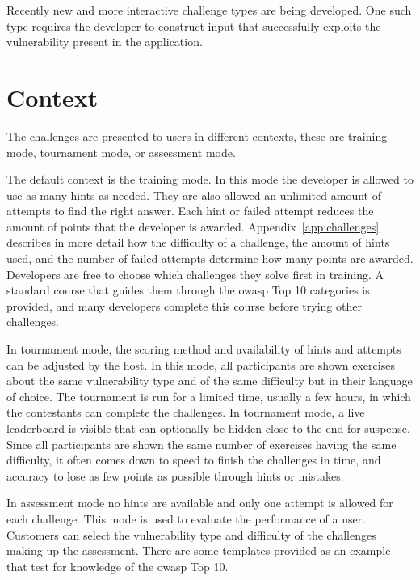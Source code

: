 Recently new and more interactive challenge types are being developed. 
One such type requires the developer to construct input that successfully exploits the vulnerability present in the application. 

\section{Context}
The challenges are presented to users in different contexts, these are training mode, tournament mode, or assessment mode.

The default context is the training mode.
In this mode the developer is allowed to use as many hints as needed.
They are also allowed an unlimited amount of attempts to find the right answer.
Each hint or failed attempt reduces the amount of points that the developer is awarded.
Appendix~\ref{app:challenges} describes in more detail how the difficulty of a challenge, the amount of hints used, and the number of failed attempts determine how many points are awarded. 
Developers are free to choose which challenges they solve first in training.
A standard course that guides them through the \gls{owasp} Top 10 categories is provided, and many developers complete this course before trying other challenges.

In tournament mode, the scoring method and availability of hints and attempts can be adjusted by the host.
In this mode, all participants are shown exercises about the same vulnerability type and of the same difficulty but in their language of choice.
The tournament is run for a limited time, usually a few hours, in which the contestants can complete the challenges.
In tournament mode, a live leaderboard is visible that can optionally be hidden close to the end for suspense.
Since all participants are shown the same number of exercises having the same difficulty, it often comes down to speed to finish the challenges in time, and accuracy to lose as few points as possible through hints or mistakes.

In assessment mode no hints are available and only one attempt is allowed for each challenge. This mode is used to evaluate the performance of a user.
Customers can select the vulnerability type and difficulty of the challenges making up the assessment.
There are some templates provided as an example that test for knowledge of the \gls{owasp} Top 10.

